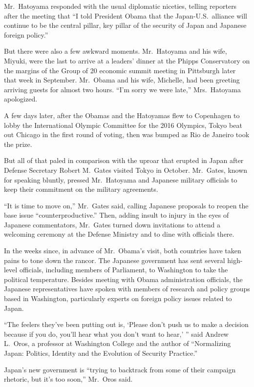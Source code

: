 ﻿\documentclass[12pt]{article}
\begin{document}
Mr.~Hatoyama responded with the usual diplomatic niceties, telling reporters after the meeting that
``I told President Obama that the Japan-U.S.~alliance will continue to be the central pillar, key
pillar of the security of Japan and Japanese foreign policy.''

But there were also a few awkward moments. Mr.~Hatoyama and his wife, Miyuki, were the last to
arrive at a leaders' dinner at the Phipps Conservatory on the margins of the Group of 20 economic
summit meeting in Pittsburgh later that week in September. Mr.~Obama and his wife, Michelle, had
been greeting arriving guests for almost two hours. ``I'm sorry we were late,'' Mrs.~Hatoyama
apologized.

A few days later, after the Obamas and the Hatoyamas flew to Copenhagen to lobby the International
Olympic Committee for the 2016 Olympics, Tokyo beat out Chicago in the first round of voting, then
was bumped as Rio de Janeiro took the prize.

But all of that paled in comparison with the uproar that erupted in Japan after Defense Secretary
Robert M.~Gates visited Tokyo in October. Mr.~Gates, known for speaking bluntly, pressed
Mr.~Hatoyama and Japanese military officials to keep their commitment on the military agreements.

``It is time to move on,'' Mr.~Gates said, calling Japanese proposals to reopen the base issue
``counterproductive.'' Then, adding insult to injury in the eyes of Japanese commentators, Mr.~Gates
turned down invitations to attend a welcoming ceremony at the Defense Ministry and to dine with
officials there.

In the weeks since, in advance of Mr.~Obama's visit, both countries have taken pains to tone down
the rancor. The Japanese government has sent several high-level officials, including members of
Parliament, to Washington to take the political temperature. Besides meeting with Obama
administration officials, the Japanese representatives have spoken with members of research and
policy groups based in Washington, particularly experts on foreign policy issues related to Japan.

``The feelers they've been putting out is, `Please don't push us to make a decision because if you
do, you'll hear what you don't want to hear,' '' said Andrew L.~Oros, a professor at Washington
College and the author of ``Normalizing Japan: Politics, Identity and the Evolution of Security
Practice.''

Japan's new government is ``trying to backtrack from some of their campaign rhetoric, but it's too
soon,'' Mr.~Oros said.
\end{document}
